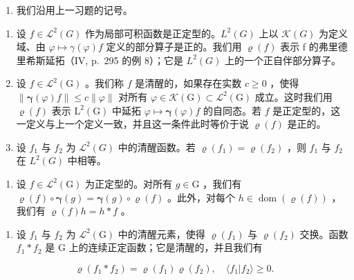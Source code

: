 \begin{enumerate}
\def\labelenumi{\arabic{enumi})}
\setcounter{enumi}{20}
\tightlist
\item
  我们沿用上一习题的记号。
\end{enumerate}

\begin{enumerate}
\def\labelenumi{\alph{enumi})}
\item
  设 \(f \in \mathcal{L}^{2}(G)\) 作为局部可积函数是正定型的。\(L^{2}(G)\) 上以 \(\mathcal{K}(G)\) 为定义域、由 \(\varphi \mapsto \gamma(\varphi)f\) 定义的部分算子是正的。我们用 \(\varrho(f)\) 表示 f 的弗里德里希斯延拓（IV, p.~295 的例 8）；它是 \(L^{2}(G)\) 上的一个正自伴部分算子。
\item
  设 \(f \in \mathcal{L}^2(\mathrm{G})\) 。我们称 \(f\) 是清醒的，如果存在实数 \(c \geqslant 0\) ，使得 \(\| \boldsymbol{\gamma}(\varphi)f \| \leqslant c \| \varphi \|\) 对所有 \(\varphi \in \mathcal{K}(\mathrm{G}) \subset \mathcal{L}^2(\mathrm{G})\) 成立。这时我们用 \(\varrho(f)\) 表示 \(\mathrm{L}^2(\mathrm{G})\) 中延拓 \(\varphi \mapsto \boldsymbol{\gamma}(\varphi)f\) 的自同态。若 \(f\) 是正定型的，这一定义与上一个定义一致，并且这一条件此时等价于说 \(\varrho(f)\) 是正的。
\item
  设 \(f_{1}\) 与 \(f_{2}\) 为 \(\mathcal{L}^{2}(G)\) 中的清醒函数。若 \(\varrho(f_{1}) = \varrho(f_{2})\) ，则 \(f_{1}\) 与 \(f_{2}\) 在 \(L^{2}(G)\) 中相等。
\end{enumerate}

\begin{enumerate}
\def\labelenumi{\alph{enumi})}
\setcounter{enumi}{3}
\tightlist
\item
  设 \(f \in \mathcal{L}^2(\mathrm{G})\) 为正定型的。对所有 \(g \in \mathrm{G}\) ，我们有 \(\varrho(f) \circ \boldsymbol{\gamma}(g) = \boldsymbol{\gamma}(g) \circ \varrho(f)\) 。此外，对每个 \(h \in \operatorname{dom}(\varrho(f))\) ，我们有 \(\varrho(f)h = h * f\) 。
\end{enumerate}

\begin{enumerate}
\def\labelenumi{\alph{enumi})}
\setcounter{enumi}{4}
\tightlist
\item
  设 \(f_{1}\) 与 \(f_{2}\) 为 \(\mathcal{L}^{2}(\mathrm{G})\) 中的清醒元素，使得 \(\varrho(f_{1})\) 与 \(\varrho(f_{2})\) 交换。函数 \(f_{1}*f_{2}\) 是 G 上的连续正定函数；它是清醒的，并且我们有
\end{enumerate}

\[
\varrho (f _ {1} * f _ {2}) = \varrho (f _ {1}) \varrho (f _ {2}), \quad \langle f _ {1} | f _ {2} \rangle \geqslant 0.
\]


